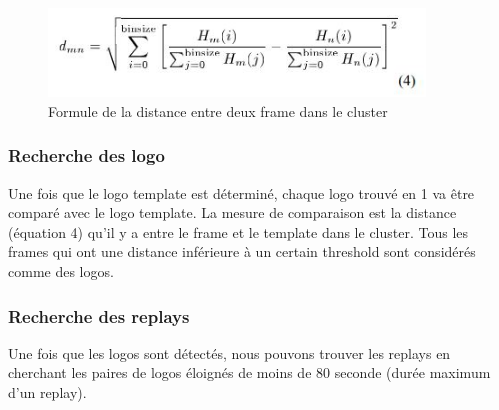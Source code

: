 \documentclass[11pt]{article}
\begin{document}
\begin{figure}[htbp]
\centering
\includegraphics[width=10cm]{robust_calc_dist.JPG}
\caption{Formule de la distance entre deux frame dans le cluster \label{calc-dist}}
\end{figure}


\subsubsection{Recherche des logo}
\label{sec:org518b39d}
Une fois que le logo template est déterminé, chaque logo trouvé en 1 va être comparé avec le logo template.
La mesure de comparaison est la distance (équation 4) qu'il y a entre le frame et le template dans le cluster.
Tous les frames qui ont une distance inférieure à un certain threshold sont considérés comme des logos.

\subsubsection{Recherche des replays}
\label{sec:org2c6f744}
Une fois que les logos sont détectés, nous pouvons trouver les replays en cherchant les paires de logos éloignés de moins de 80 seconde (durée maximum d'un replay).
\end{document}
